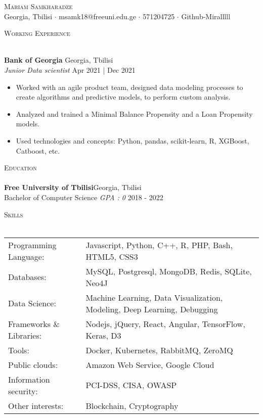 \documentclass[a4paper]{article}
\newcommand{\lineunder} {
    \vspace*{-8pt} \\
    \hspace*{-18pt} \hrulefill \\
}
\newcommand{\header} [1] {
    {\hspace*{-18pt}\vspace*{6pt} \textsc{#1}}
    \vspace*{-6pt} \lineunder
}
\begin{document}
\vspace*{-40pt}

    

\vspace*{-10pt}
\begin{center}
	{\Huge \scshape {Mariam Samkharadze}}\\
	Georgia, Tbilisi $\cdot$ msamk18@freeuni.edu.ge $\cdot$ 571204725 $\cdot$ Github-Miralllll\\
\end{center}


\header{Working Experience}
\vspace{1mm}

\textbf{Bank of Georgia} \hfill Georgia, Tbilisi\\
\textit{Junior Data scientist} \hfill Apr 2021 | Dec 2021\\
\vspace{-1mm}
\begin{itemize} \itemsep 1pt
	\item  Worked with an agile product team,
designed data modeling processes to create algorithms
and predictive models, to perform custom analysis.

	\item  Analyzed and trained a Minimal Balance Propensity and a
Loan Propensity models.
    \item  Used technologies and concepts: Python, pandas, scikit-learn, R, XGBoost, Catboost, etc.
\end{itemize}


\header{Education}
\textbf{Free University of Tbilisi}\hfill Georgia, Tbilisi\\
Bachelor of Computer Science \textit{GPA : 0} \hfill 2018 - 2022\\
\vspace{2mm}

\header{Skills}
\begin{tabular}{ l l }
	Programming Language:    & Javascript, Python, C++, R, PHP, Bash, HTML5, CSS3                       \\
	Databases:               & MySQL, Postgresql, MongoDB, Redis, SQLite, Neo4J                         \\
	Data Science:            & Machine Learning, Data Visualization, Modeling, Deep Learning, Debugging \\
	Frameworks \& Libraries: & Nodejs, jQuery, React, Angular, TensorFlow, Keras, D3                    \\
	Tools:                   & Docker, Kubernetes, RabbitMQ, ZeroMQ                                     \\
	Public clouds:           & Amazon Web Service, Google Cloud                                         \\
	Information security:    & PCI-DSS, CISA, OWASP                                                     \\
	Other interests:         & Blockchain, Cryptography                                                 \\
\end{tabular}
\vspace{2mm}



\ 
\end{document}
